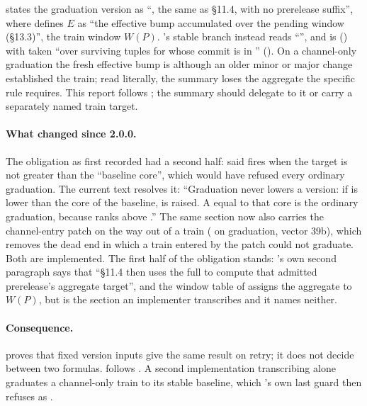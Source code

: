 \begin{obligation}
\label{ob:graduation}
 states the graduation version as ``, the
same  as \S11.4, with no prerelease suffix'', where 
defines $E$ as ``the effective bump accumulated over the pending window
(\S13.3)'', the train window $W(P)$. 's stable branch instead
reads ``'', and
 is  ()
with  taken ``over surviving tuples for  whose commit
is in '' (). On a channel-only graduation the
fresh effective bump is \bnone{} although an older minor or major change
established the train; read literally, the summary loses the aggregate the
specific rule requires. This report follows ; the summary should
delegate to it or carry a separately named train target.
\end{obligation}

\paragraph{What changed since 2.0.0.} The obligation as first recorded had a
second half:  said  fires when the target is not
greater than the ``baseline core'', which would have refused every ordinary
graduation. The current text resolves it: ``Graduation never lowers a
version: if  is lower than the core of the baseline, 
is raised. A  equal to that core is the ordinary graduation,
because  ranks above .'' The same section now
also carries the channel-entry patch on the way out of a train (
on graduation, vector 39b), which removes the dead end in which a train
entered by the patch could not graduate. Both are implemented. The first
half of the obligation stands: 's own second paragraph says that
``\S11.4 then uses the full  to compute that admitted
prerelease's aggregate target'', and the window table of  assigns
the aggregate to $W(P)$, but  is the section an implementer
transcribes and it names neither.

\paragraph{Consequence.}  proves that fixed version inputs give
the same result on retry; it does not decide between two formulas.
 follows . A second implementation transcribing
 alone graduates a channel-only train to its stable baseline,
which 's own last guard then refuses as .

